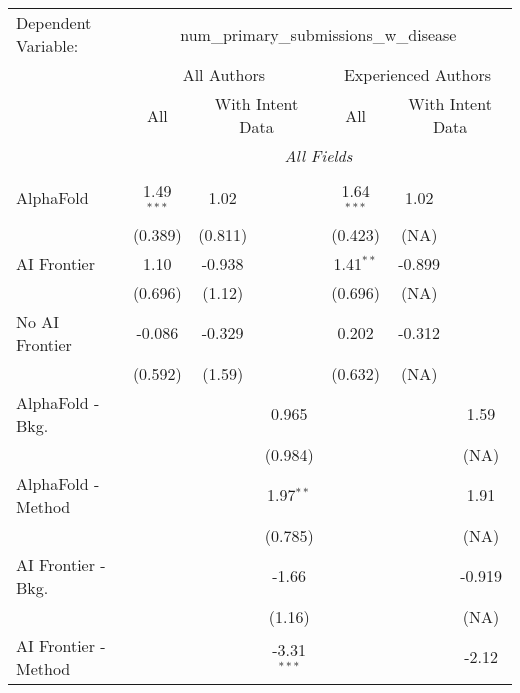 \begingroup
\centering
\begin{tabular}{lcccccc}
   \tabularnewline \midrule \midrule
   Dependent Variable: & \multicolumn{6}{c}{num\_primary\_submissions\_w\_disease}\\
 & \multicolumn{3}{c}{All Authors} & \multicolumn{3}{c}{Experienced Authors} \\
\cmidrule(lr){2-4} \cmidrule(lr){5-7}
 & \multicolumn{1}{c}{All} & \multicolumn{2}{c}{With Intent Data} & \multicolumn{1}{c}{All} & \multicolumn{2}{c}{With Intent Data} \\
\cmidrule(lr){2-2} \cmidrule(lr){3-4} \cmidrule(lr){5-5} \cmidrule(lr){6-7}
 & \multicolumn{6}{c}{\textit{All Fields}} \\ \\
   AlphaFold               & 1.49$^{***}$ & 1.02    &               & 1.64$^{***}$ & 1.02   &   \\   
                           & (0.389)      & (0.811) &               & (0.423)      & (NA)   &   \\   
   AI Frontier             & 1.10         & -0.938  &               & 1.41$^{**}$  & -0.899 &   \\   
                           & (0.696)      & (1.12)  &               & (0.696)      & (NA)   &   \\   
   No AI Frontier          & -0.086       & -0.329  &               & 0.202        & -0.312 &   \\   
                           & (0.592)      & (1.59)  &               & (0.632)      & (NA)   &   \\   
   AlphaFold - Bkg.        &              &         & 0.965         &              &        & 1.59\\   
                           &              &         & (0.984)       &              &        & (NA)\\   
   AlphaFold - Method      &              &         & 1.97$^{**}$   &              &        & 1.91\\   
                           &              &         & (0.785)       &              &        & (NA)\\   
   AI Frontier - Bkg.      &              &         & -1.66         &              &        & -0.919\\   
                           &              &         & (1.16)        &              &        & (NA)\\   
   AI Frontier - Method    &              &         & -3.31$^{***}$ &              &        & -2.12\\   

\end{tabular}
